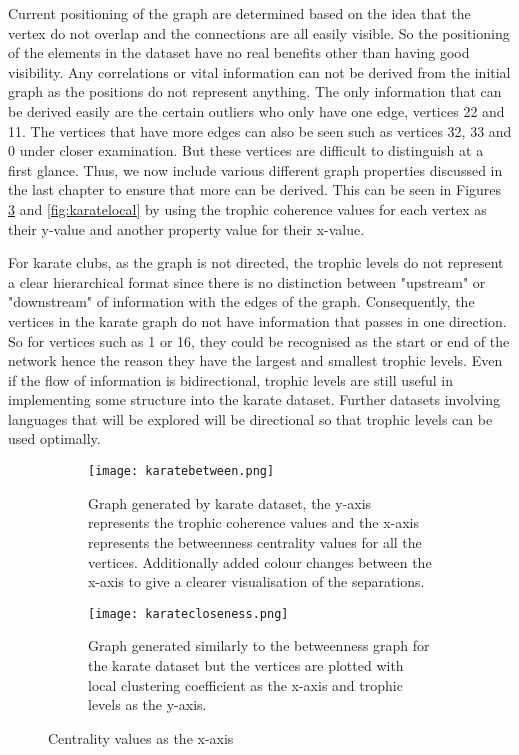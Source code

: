 Current positioning of the graph are determined based on the idea that the vertex do not overlap and the connections are all easily visible. So the positioning of the elements in the dataset have no real benefits other than having good visibility. Any correlations or vital information can not be derived from the initial graph as the positions do not represent anything. The only information that can be derived easily are the certain outliers who only have one edge, vertices 22 and 11. The vertices that have more edges can also be seen such as vertices 32, 33 and 0 under closer examination. But these vertices are difficult to distinguish at a first glance. Thus, we now include various different graph properties discussed in the last chapter to ensure that more can be derived. This can be seen in Figures \ref{fig:karatecentrality} and \ref{fig:karatelocal} by using the trophic coherence values for each vertex as their y-value and another property value for their x-value.

For karate clubs, as the graph is not directed, the trophic levels do not represent a clear hierarchical format since there is no distinction between "upstream" or "downstream" of information with the edges of the graph. Consequently, the vertices in the karate graph do not have information that passes in one direction. So for vertices such as 1 or 16, they could be recognised as the start or end of the network hence the reason they have the largest and smallest trophic levels. Even if the flow of information is bidirectional, trophic levels are still useful in implementing some structure into the karate dataset. Further datasets involving languages that will be explored will be directional so that trophic levels can be used optimally.

\begin{figure}[H]
\centering
\begin{subfigure}{.45\textwidth}
	\texttt{[image: karatebetween.png]}
	\caption{Graph generated by karate dataset, the y-axis represents the trophic coherence values and the x-axis represents the betweenness centrality values for all the vertices. Additionally added colour changes between the x-axis to give a clearer visualisation of the separations.}
	\label{fig:karatea}
\end{subfigure}
\hfill
\begin{subfigure}{.45\textwidth}
	\texttt{[image: karatecloseness.png]}
	\caption{Graph generated similarly to the betweenness graph for the karate dataset but the vertices are plotted with local clustering coefficient as the x-axis and trophic levels as the y-axis.}
	\label{fig:karateb}
\end{subfigure}
\caption{Centrality values as the x-axis}
\label{fig:karatecentrality}
\end{figure}

